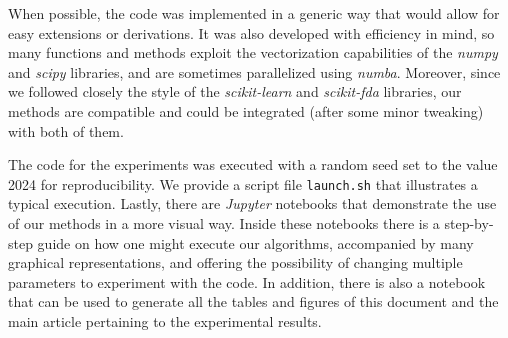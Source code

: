 When possible, the code was implemented in a generic way that would allow for easy extensions or derivations. It was also developed with efficiency in mind, so many functions and methods exploit the vectorization capabilities of the \textit{numpy} and \textit{scipy} libraries, and are sometimes parallelized using \textit{numba}. Moreover, since we followed closely the style of the \textit{scikit-learn} and \textit{scikit-fda} libraries, our methods are compatible and could be integrated (after some minor tweaking) with both of them. 

The code for the experiments was executed with a random seed set to the value 2024 for reproducibility. We provide a script file \texttt{launch.sh} that illustrates a typical execution. Lastly, there are \textit{Jupyter} notebooks that demonstrate the use of our methods in a more visual way. Inside these notebooks there is a step-by-step guide on how one might execute our algorithms, accompanied by many graphical representations, and offering the possibility of changing multiple parameters to experiment with the code. In addition, there is also a notebook that can be used to generate all the tables and figures of this document and the main article pertaining to the experimental results.


